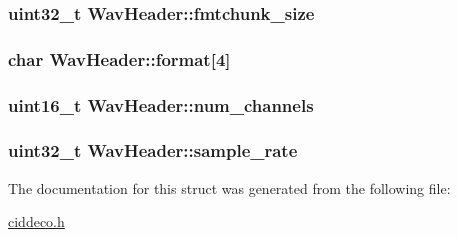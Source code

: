 \subsubsection[{fmtchunk\+\_\+size}]{\setlength{\rightskip}{0pt plus 5cm}uint32\+\_\+t Wav\+Header\+::fmtchunk\+\_\+size}\label{structWavHeader_a4ef84c118ca11eb3aca198b8e2a14294}
\hypertarget{structWavHeader_ab1748144c5a74f514973d13aa2257e7c}{}
\subsubsection[{format}]{\setlength{\rightskip}{0pt plus 5cm}char Wav\+Header\+::format\mbox{[}4\mbox{]}}\label{structWavHeader_ab1748144c5a74f514973d13aa2257e7c}
\hypertarget{structWavHeader_a072ed76b242729913c20ed54643c7516}{}
\subsubsection[{num\+\_\+channels}]{\setlength{\rightskip}{0pt plus 5cm}uint16\+\_\+t Wav\+Header\+::num\+\_\+channels}\label{structWavHeader_a072ed76b242729913c20ed54643c7516}
\hypertarget{structWavHeader_ae6042020cde1102dfeabfc30576c1e52}{}
\subsubsection[{sample\+\_\+rate}]{\setlength{\rightskip}{0pt plus 5cm}uint32\+\_\+t Wav\+Header\+::sample\+\_\+rate}\label{structWavHeader_ae6042020cde1102dfeabfc30576c1e52}


The documentation for this struct was generated from the following file\+:\begin{DoxyCompactItemize}
\item 
\hyperlink{ciddeco_8h}{ciddeco.\+h}\end{DoxyCompactItemize}
